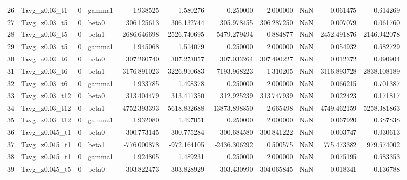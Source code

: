 \begin{tabular}{llrlrrrrrrr}
26 &     Tavg_z0.03_t1 &       0 &    gamma1 &      1.938525 &      1.580276 &      0.250000 &     2.000000 &      NaN &      0.061475 &      0.614269 \\
27 &     Tavg_z0.03_t5 &       0 &     beta0 &    306.125613 &    306.132744 &    305.978455 &   306.287250 &      NaN &      0.007079 &      0.061760 \\
28 &     Tavg_z0.03_t5 &       0 &     beta1 &  -2686.646698 &  -2526.740695 &  -5479.279494 &     0.884877 &      NaN &   2452.491876 &   2146.942078 \\
29 &     Tavg_z0.03_t5 &       0 &    gamma1 &      1.945068 &      1.514079 &      0.250000 &     2.000000 &      NaN &      0.054932 &      0.682729 \\
30 &     Tavg_z0.03_t6 &       0 &     beta0 &    307.260740 &    307.273057 &    307.033264 &   307.490227 &      NaN &      0.012372 &      0.090904 \\
31 &     Tavg_z0.03_t6 &       0 &     beta1 &  -3176.891023 &  -3226.910683 &  -7193.968223 &     1.310205 &      NaN &   3116.893728 &   2838.108189 \\
32 &     Tavg_z0.03_t6 &       0 &    gamma1 &      1.933785 &      1.498378 &      0.250000 &     2.000000 &      NaN &      0.066215 &      0.701387 \\
33 &    Tavg_z0.03_t12 &       0 &     beta0 &    313.404479 &    313.411350 &    312.925239 &   313.747939 &      NaN &      0.022423 &      0.171817 \\
34 &    Tavg_z0.03_t12 &       0 &     beta1 &  -4752.393393 &  -5618.832688 & -13873.898850 &     2.665498 &      NaN &   4749.462159 &   5258.381863 \\
35 &    Tavg_z0.03_t12 &       0 &    gamma1 &      1.932080 &      1.497051 &      0.250000 &     2.000000 &      NaN &      0.067920 &      0.687838 \\
36 &    Tavg_z0.045_t1 &       0 &     beta0 &    300.773145 &    300.775284 &    300.684580 &   300.841222 &      NaN &      0.003747 &      0.030613 \\
37 &    Tavg_z0.045_t1 &       0 &     beta1 &   -776.000878 &   -972.164105 &  -2436.306292 &     0.500575 &      NaN &    775.473382 &    979.674002 \\
38 &    Tavg_z0.045_t1 &       0 &    gamma1 &      1.924805 &      1.489231 &      0.250000 &     2.000000 &      NaN &      0.075195 &      0.683353 \\
39 &    Tavg_z0.045_t5 &       0 &     beta0 &    303.822473 &    303.828929 &    303.430990 &   304.065845 &      NaN &      0.018341 &      0.136788 \\

\end{tabular}

